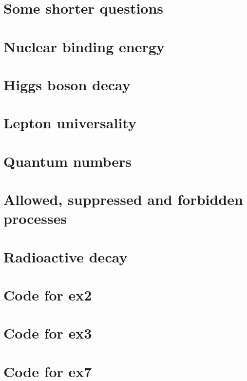 \documentclass[]{article}
\begin{document}
\section{Some shorter questions}


\section{Nuclear binding energy}


\section{Higgs boson decay}


\section{Lepton universality}


\section{Quantum numbers}


\section{Allowed, suppressed and forbidden processes}


\section{Radioactive decay}


\section{Code for ex2}


\section{Code for ex3}


\section{Code for ex7}

\end{document}
